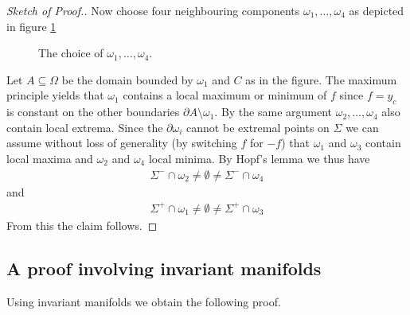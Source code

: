 \begin{proof}[Sketch of Proof.]
  Now choose four neighbouring components $\omega_1,\dots,\omega_4$ as depicted in figure \ref{fi:n2:levelSets:neighbouringComponents}
  \begin{figure}
    \centering
    
    \caption{The choice of $\omega_1,\dots,\omega_4$.}
    \label{fi:n2:levelSets:neighbouringComponents}
  \end{figure}
  Let $A\subseteq\Omega$ be the domain bounded
  by $\omega_1$ and $C$ as in the figure. The maximum principle yields that $\omega_1$ contains a local maximum or minimum of $f$ since
  $f=y_c$ is constant on the other boundaries $\partial A\setminus\omega_1$.
  By the same argument $\omega_2,\dots,\omega_4$ also contain local extrema. 
  Since the $\partial\omega_i$ cannot be extremal points on $\Sigma$
  we can assume without loss of generality (by switching $f$ for $-f$) that $\omega_1$ and $\omega_3$ contain local maxima and $\omega_2 $ and $\omega_4$ local
  minima. By Hopf's lemma we thus have
  \begin{align*}
    \Sigma^-\cap\omega_2\neq\emptyset\neq\Sigma^-\cap\omega_4
  \end{align*}
  and 
  \begin{align*}
    \Sigma^+\cap\omega_1\neq\emptyset\neq\Sigma^+\cap\omega_3
  \end{align*}
  From this the claim follows.
\end{proof}

\subsection{A proof involving invariant manifolds}

Using invariant manifolds we obtain the following proof.

